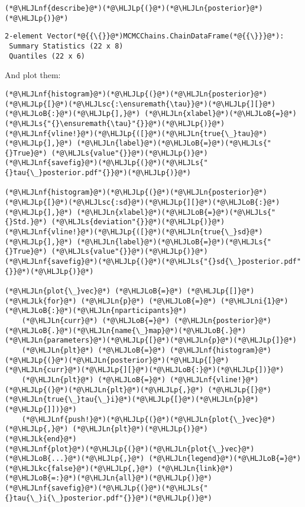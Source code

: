 \documentclass[12pt,a4paper]{article}
\newcommand{\HLJLk}[1]{\textcolor[RGB]{148,91,176}{\textbf{#1}}}
\newcommand{\HLJLkc}[1]{\textcolor[RGB]{59,151,46}{\textit{#1}}}
\newcommand{\HLJLn}[1]{#1}
\newcommand{\HLJLnf}[1]{\textcolor[RGB]{66,102,213}{#1}}
\newcommand{\HLJLs}[1]{\textcolor[RGB]{201,61,57}{#1}}
\newcommand{\HLJLsc}[1]{\textcolor[RGB]{201,61,57}{#1}}
\newcommand{\HLJLni}[1]{\textcolor[RGB]{59,151,46}{#1}}
\newcommand{\HLJLoB}[1]{\textcolor[RGB]{102,102,102}{\textbf{#1}}}
\newcommand{\HLJLp}[1]{#1}
\begin{document}
\begin{lstlisting}
(*@\HLJLnf{describe}@*)(*@\HLJLp{(}@*)(*@\HLJLn{posterior}@*)(*@\HLJLp{)}@*)
\end{lstlisting}

\begin{lstlisting}
2-element Vector(*@{{\{}}@*)MCMCChains.ChainDataFrame(*@{{\}}}@*):
 Summary Statistics (22 x 8)
 Quantiles (22 x 6)
\end{lstlisting}


And plot them:


\begin{lstlisting}
(*@\HLJLnf{histogram}@*)(*@\HLJLp{(}@*)(*@\HLJLn{posterior}@*)(*@\HLJLp{[}@*)(*@\HLJLsc{:\ensuremath{\tau}}@*)(*@\HLJLp{][}@*)(*@\HLJLoB{:}@*)(*@\HLJLp{],}@*) (*@\HLJLn{xlabel}@*)(*@\HLJLoB{=}@*)(*@\HLJLs{"{}\ensuremath{\tau}"{}}@*)(*@\HLJLp{)}@*)
(*@\HLJLnf{vline!}@*)(*@\HLJLp{([}@*)(*@\HLJLn{true{\_}tau}@*)(*@\HLJLp{],}@*) (*@\HLJLn{label}@*)(*@\HLJLoB{=}@*)(*@\HLJLs{"{}True}@*) (*@\HLJLs{value"{}}@*)(*@\HLJLp{)}@*)
(*@\HLJLnf{savefig}@*)(*@\HLJLp{(}@*)(*@\HLJLs{"{}tau{\_}posterior.pdf"{}}@*)(*@\HLJLp{)}@*)

(*@\HLJLnf{histogram}@*)(*@\HLJLp{(}@*)(*@\HLJLn{posterior}@*)(*@\HLJLp{[}@*)(*@\HLJLsc{:sd}@*)(*@\HLJLp{][}@*)(*@\HLJLoB{:}@*)(*@\HLJLp{],}@*) (*@\HLJLn{xlabel}@*)(*@\HLJLoB{=}@*)(*@\HLJLs{"{}Std.}@*) (*@\HLJLs{deviation"{}}@*)(*@\HLJLp{)}@*)
(*@\HLJLnf{vline!}@*)(*@\HLJLp{([}@*)(*@\HLJLn{true{\_}sd}@*)(*@\HLJLp{],}@*) (*@\HLJLn{label}@*)(*@\HLJLoB{=}@*)(*@\HLJLs{"{}True}@*) (*@\HLJLs{value"{}}@*)(*@\HLJLp{)}@*)
(*@\HLJLnf{savefig}@*)(*@\HLJLp{(}@*)(*@\HLJLs{"{}sd{\_}posterior.pdf"{}}@*)(*@\HLJLp{)}@*)

(*@\HLJLn{plot{\_}vec}@*) (*@\HLJLoB{=}@*) (*@\HLJLp{[]}@*)
(*@\HLJLk{for}@*) (*@\HLJLn{p}@*) (*@\HLJLoB{=}@*) (*@\HLJLni{1}@*)(*@\HLJLoB{:}@*)(*@\HLJLn{nparticipants}@*)
    (*@\HLJLn{curr}@*) (*@\HLJLoB{=}@*) (*@\HLJLn{posterior}@*)(*@\HLJLoB{.}@*)(*@\HLJLn{name{\_}map}@*)(*@\HLJLoB{.}@*)(*@\HLJLn{parameters}@*)(*@\HLJLp{[}@*)(*@\HLJLn{p}@*)(*@\HLJLp{]}@*)
    (*@\HLJLn{plt}@*) (*@\HLJLoB{=}@*) (*@\HLJLnf{histogram}@*)(*@\HLJLp{(}@*)(*@\HLJLn{posterior}@*)(*@\HLJLp{[}@*)(*@\HLJLn{curr}@*)(*@\HLJLp{][}@*)(*@\HLJLoB{:}@*)(*@\HLJLp{])}@*)
    (*@\HLJLn{plt}@*) (*@\HLJLoB{=}@*) (*@\HLJLnf{vline!}@*)(*@\HLJLp{(}@*)(*@\HLJLn{plt}@*)(*@\HLJLp{,}@*) (*@\HLJLp{[}@*)(*@\HLJLn{true{\_}tau{\_}i}@*)(*@\HLJLp{[}@*)(*@\HLJLn{p}@*)(*@\HLJLp{]])}@*)
    (*@\HLJLnf{push!}@*)(*@\HLJLp{(}@*)(*@\HLJLn{plot{\_}vec}@*)(*@\HLJLp{,}@*) (*@\HLJLn{plt}@*)(*@\HLJLp{)}@*)
(*@\HLJLk{end}@*)
(*@\HLJLnf{plot}@*)(*@\HLJLp{(}@*)(*@\HLJLn{plot{\_}vec}@*)(*@\HLJLoB{...}@*)(*@\HLJLp{,}@*) (*@\HLJLn{legend}@*)(*@\HLJLoB{=}@*)(*@\HLJLkc{false}@*)(*@\HLJLp{,}@*) (*@\HLJLn{link}@*)(*@\HLJLoB{=:}@*)(*@\HLJLn{all}@*)(*@\HLJLp{)}@*)
(*@\HLJLnf{savefig}@*)(*@\HLJLp{(}@*)(*@\HLJLs{"{}tau{\_}i{\_}posterior.pdf"{}}@*)(*@\HLJLp{)}@*)
\end{lstlisting}
\end{document}

